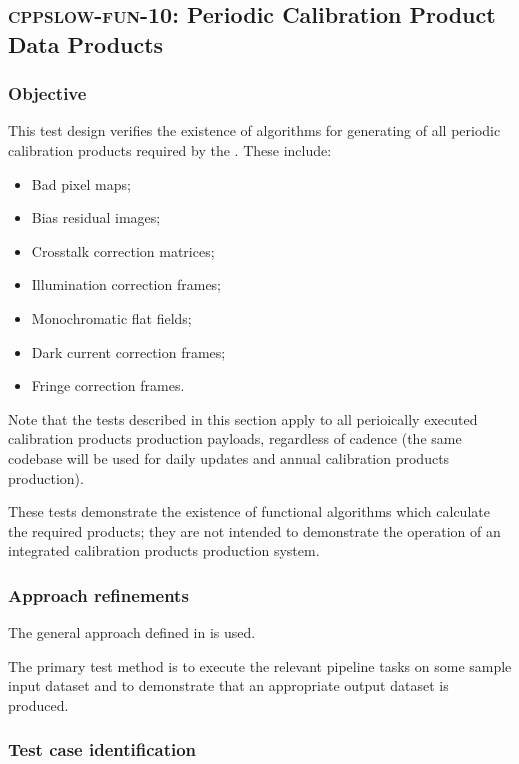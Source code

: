 \subsection{\textsc{cppslow-fun-10}: Periodic Calibration Product Data Products}
\label{cppslow-fun-10}

\subsubsection{Objective}

This test design verifies the existence of algorithms for generating of all
periodic calibration products required by the . These include:

\begin{itemize}

  \item{Bad pixel maps;}
  \item{Bias residual images;}
  \item{Crosstalk correction matrices;}
  \item{Illumination correction frames;}
  \item{Monochromatic flat fields;}
  \item{Dark current correction frames;}
  \item{Fringe correction frames.}

\end{itemize}

Note that the tests described in this section apply to all perioically
executed calibration products production payloads, regardless of cadence (the
same codebase will be used for daily updates and annual calibration products
production).

These tests demonstrate the existence of functional algorithms which calculate
the required products; they are not intended to demonstrate the operation of
an integrated calibration products production system.

\subsubsection{Approach refinements}

The general approach defined in  is used.

The primary test method is to execute the relevant pipeline tasks on some
sample input dataset and to demonstrate that an appropriate output dataset is
produced.

\subsubsection{Test case identification}

